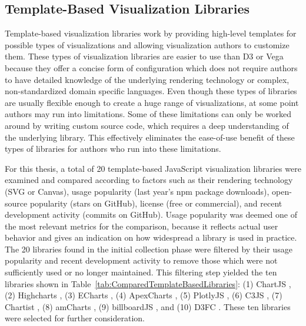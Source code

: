 \subsection{Template-Based Visualization Libraries}

Template-based visualization libraries work by providing high-level
templates for possible types of visualizations and allowing
visualization authors to customize them. These types of visualization
libraries are easier to use than D3 or Vega because they offer a
concise form of configuration which does not require authors to have
detailed knowledge of the underlying rendering technology or complex,
non-standardized domain specific languages. Even though these types of
libraries are usually flexible enough to create a huge range of
visualizations, at some point authors may run into limitations.  Some
of these limitations can only be worked around by writing custom
source code, which requires a deep understanding of the underlying
library. This effectively eliminates the ease-of-use benefit of these
types of libraries for authors who run into these limitations.

For this thesis, a total of 20 template-based JavaScript visualization
libraries were examined and compared according to factors such as
their rendering technology (SVG or Canvas), usage popularity (last
year's npm package downloads), open-source popularity (stars on
GitHub), license (free or commercial), and recent development activity
(commits on GitHub). Usage popularity was deemed one of the most
relevant metrics for the comparison, because it reflects actual user
behavior and gives an indication on how widespread a library is used
in practice. The 20 libraries found in the initial collection phase
were filtered by their usage popularity and recent development
activity to remove those which were not sufficiently used or no longer
maintained. This filtering step yielded the ten libraries shown in
Table~\ref{tab:ComparedTemplateBasedLibraries}: (1) ChartJS
\parencite{ChartJS}, (2) Highcharts \parencite{Highcharts}, (3)
ECharts \parencite{ECharts}, (4) ApexCharts \parencite{ApexCharts},
(5) PlotlyJS \parencite{PlotlyJS}, (6) C3JS \parencite{C3JS}, (7)
Chartist \parencite{Chartist}, (8) amCharts \parencite{amCharts}, (9)
billboardJS \parencite{billboardJS}, and (10) D3FC \parencite{D3FC}.
These ten libraries were selected for further consideration.



